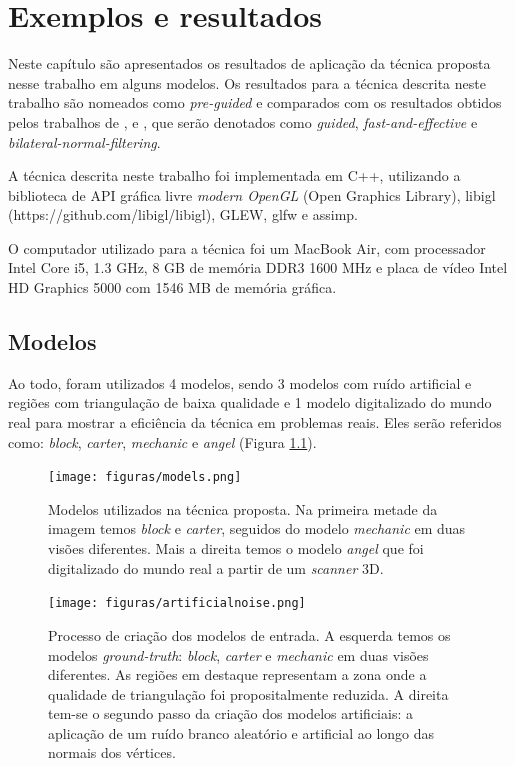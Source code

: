 \chapter{Exemplos e resultados}
\label{chap:exemploseresultados}

Neste capítulo são apresentados os resultados de aplicação da técnica proposta nesse trabalho em alguns modelos. Os resultados para a técnica descrita neste trabalho são nomeados como \textit{pre-guided} e comparados com os resultados obtidos pelos trabalhos de \cite{zhang2015guided}, \cite{sun2007fast} e \cite{zheng2011bilateral}, que serão denotados como \textit{guided}, \textit{fast-and-effective} e \textit{bilateral-normal-filtering}.

A técnica descrita neste trabalho foi implementada em C++, utilizando a biblioteca de API gráfica livre \textit{modern OpenGL} (Open Graphics Library), libigl (https://github.com/libigl/libigl), GLEW, glfw e assimp.

O computador utilizado para a técnica foi um MacBook Air, com processador Intel Core i5, 1.3 GHz, 8 GB de memória DDR3 1600 MHz e placa de vídeo Intel HD Graphics 5000 com 1546 MB de memória gráfica.

\section{Modelos}

Ao todo, foram utilizados 4 modelos, sendo 3 modelos com ruído artificial e regiões com triangulação de baixa qualidade e 1 modelo digitalizado do mundo real para mostrar a eficiência da técnica em problemas reais. Eles serão referidos como: \textit{block}, \textit{carter}, \textit{mechanic} e \textit{angel} (Figura \ref{fig:models}). 

\begin{figure}[!h]
\captionsetup{width=\linewidth}
\centering
\texttt{[image: figuras/models.png]}
\caption{Modelos utilizados na técnica proposta. Na primeira metade da imagem temos \textit{block} e \textit{carter}, seguidos do modelo \textit{mechanic} em duas visões diferentes. Mais a direita temos o modelo \textit{angel} que foi digitalizado do mundo real a partir de um \textit{scanner} 3D.}
\label{fig:models}
\end{figure}

\begin{figure}[!h]
\captionsetup{width=\linewidth}
\centering 
\texttt{[image: figuras/artificialnoise.png]}
\caption{Processo de criação dos modelos de entrada. A esquerda temos os modelos \textit{ground-truth}: \textit{block}, \textit{carter} e \textit{mechanic} em duas visões diferentes. As regiões em destaque representam a zona onde a qualidade de triangulação foi propositalmente reduzida. A direita tem-se o segundo passo da criação dos modelos artificiais: a aplicação de um ruído branco aleatório e artificial ao longo das normais dos vértices.}
\label{fig:artificialnoise}
\end{figure}

